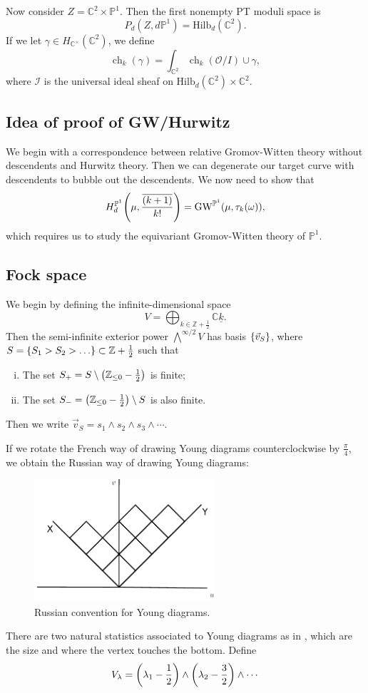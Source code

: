 \documentclass[leqno, openany]{memoir}
\theoremstyle{definition}
\theoremstyle{remark}
\theoremstyle{plain}
\theoremstyle{definition}
\theoremstyle{remark}
\newcommand{\C}{\mathbb{C}}
\newcommand{\Z}{\mathbb{Z}}
\renewcommand{\P}{\mathbb{P}}
\newcommand{\mc}[1]{\mathcal{#1}}
\newcommand{\mr}[1]{\mathrm{#1}}
\newcommand{\ol}[1]{\overline{#1}}
\newcommand{\ul}[1]{\underline{#1}}
\DeclareMathOperator{\ch}{ch}
\begin{document}
Now consider $Z = \C^2 \times \P^1$. Then the first nonempty PT moduli space is
\[ P_d(Z, d \P^1) = \mr{Hilb}_d(\C^2). \]
If we let $\gamma \in H_{\C^{\times}}(\C^2)$, we define
\[ \ch_k(\gamma) = \int_{\C^2} \ch_k(\mc{O}/I) \cup \gamma, \]
where $\mc{I}$ is the universal ideal sheaf on $\mr{Hilb}_d(\C^2) \times \C^2$.

\subsection{Idea of proof of GW/Hurwitz}

We begin with a correspondence between relative Gromov-Witten theory without descendents and Hurwitz theory. Then we can degenerate our target curve with descendents to bubble out the descendents. We now need to show that
\[ H_d^{\P^1} \qty(\mu, \frac{\ol{(k+1)}}{k!}) = \mr{GW}^{\P^1}(\mu, \tau_k(\omega)), \]
which requires us to study the equivariant Gromov-Witten theory of $\P^1$.

\subsection{Fock space}\label{sub:fock}

We begin by defining the infinite-dimensional space
\[ V = \bigoplus_{k \in \Z + \frac{1}{2}} \C \ul{k}. \]
Then the semi-infinite exterior power $\bigwedge^{\infty/2} V$ has basis $\qty{\vec{v}_S}$, where $S = \qty{S_1 > S_2 > \ldots} \subset \Z + \frac{1}{2}$ such that
\begin{enumerate}[(i)]
    \item The set $S_+ = S \setminus \qty(\Z_{\leq 0} - \frac{1}{2})$ is finite;
    \item The set $S_- = \qty(\Z_{\leq 0} - \frac{1}{2}) \setminus S$ is also finite.
\end{enumerate}
Then we write $\vec{v}_S = s_1 \wedge s_2 \wedge s_3 \wedge \cdots$.

If we rotate the French way of drawing Young diagrams counterclockwise by $\frac{\pi}{4}$, we obtain the Russian way of drawing Young diagrams:
\begin{figure}[H]
    \centering
    \includegraphics[width=0.6\textwidth]{ydiagru}
    \caption{Russian convention for Young diagrams.}
    \label{fig:ydiagru}
\end{figure}
There are two natural statistics associated to Young diagrams as in , which are the size and where the vertex touches the bottom. Define 
\[ V_{\lambda} = \qty(\lambda_1 - \frac{1}{2}) \wedge \qty(\lambda_2 - \frac{3}{2}) \wedge \cdots \]
\end{document}
